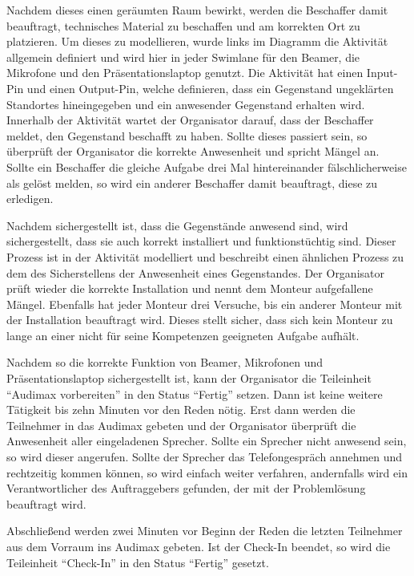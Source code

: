 Nachdem dieses einen geräumten Raum bewirkt, werden die Beschaffer damit beauftragt, technisches Material zu beschaffen und am korrekten Ort zu platzieren. Um dieses zu modellieren, wurde links im Diagramm die Aktivität  allgemein definiert und wird hier in jeder Swimlane für den Beamer, die Mikrofone und den Präsentationslaptop genutzt. Die Aktivität hat einen Input-Pin und einen Output-Pin, welche definieren, dass ein Gegenstand ungeklärten Standortes hineingegeben und ein anwesender Gegenstand erhalten wird. Innerhalb der Aktivität wartet der Organisator darauf, dass der Beschaffer meldet, den Gegenstand beschafft zu haben. Sollte dieses passiert sein, so überprüft der Organisator die korrekte Anwesenheit und spricht Mängel an. Sollte ein Beschaffer die gleiche Aufgabe drei Mal hintereinander fälschlicherweise als gelöst melden, so wird ein anderer Beschaffer damit beauftragt, diese zu erledigen.

Nachdem sichergestellt ist, dass die Gegenstände anwesend sind, wird sichergestellt, dass sie auch korrekt installiert und funktionstüchtig sind. Dieser Prozess ist in der Aktivität  modelliert und beschreibt einen ähnlichen Prozess zu dem des Sicherstellens der Anwesenheit eines Gegenstandes. Der Organisator prüft wieder die korrekte Installation und nennt dem Monteur aufgefallene Mängel. Ebenfalls hat jeder Monteur drei Versuche, bis ein anderer Monteur mit der Installation beauftragt wird. Dieses stellt sicher, dass sich kein Monteur zu lange an einer nicht für seine Kompetenzen geeigneten Aufgabe aufhält.

Nachdem so die korrekte Funktion von Beamer, Mikrofonen und Präsentationslaptop sichergestellt ist, kann der Organisator die Teileinheit \enquote{Audimax vorbereiten} in den Status \enquote{Fertig} setzen. Dann ist keine weitere Tätigkeit bis zehn Minuten vor den Reden nötig. Erst dann werden die Teilnehmer in das Audimax gebeten und der Organisator überprüft die Anwesenheit aller eingeladenen Sprecher. Sollte ein Sprecher nicht anwesend sein, so wird dieser angerufen. Sollte der Sprecher das Telefongespräch annehmen und rechtzeitig kommen können, so wird einfach weiter verfahren, andernfalls wird ein Verantwortlicher des Auftraggebers gefunden, der mit der Problemlösung beauftragt wird. 

Abschließend werden zwei Minuten vor Beginn der Reden die letzten Teilnehmer aus dem Vorraum ins Audimax gebeten. Ist der Check-In beendet, so wird die Teileinheit \enquote{Check-In} in den Status \enquote{Fertig} gesetzt.

